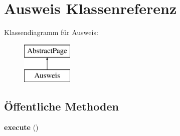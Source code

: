 \hypertarget{class_ausweis}{}\section{Ausweis Klassenreferenz}
\label{class_ausweis}
Klassendiagramm für Ausweis\+:\begin{figure}[H]
\begin{center}
\leavevmode
\includegraphics[height=2.000000cm]{class_ausweis}
\end{center}
\end{figure}
\subsection*{Öffentliche Methoden}
\begin{DoxyCompactItemize}
\item 
\mbox{\label{class_ausweis_a010e93af800c0c367dccf3856383fbff}} 
{\bfseries execute} ()
\end{DoxyCompactItemize}
